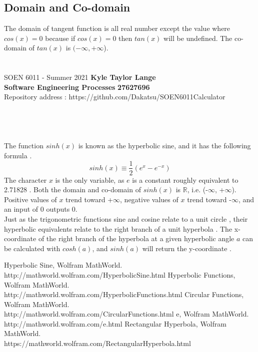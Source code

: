 \documentclass[a4paper, 11pt]{report}
\begin{document}
 \subsection*{Domain and Co-domain}
 \normalsize{The domain of tangent function is all real number except the value where $cos(x) = 0$ because if $cos(x) = 0$ then $tan(x)$ will be undefined. The co-domain of $tan(x)$ is \((-\infty, +\infty\)).}
\pagebreak

\section*{}
\normalsize {SOEN 6011 - Summer 2021} \hfill \textbf{Kyle Taylor Lange} \\
\textbf{ Software Engineering Processes}  \hfill \textbf{27627696} \\
\hfill Repository address : https://github.com/Dakatsu/SOEN6011Calculator
\\\\\\\\\\
\normalsize{The function $sinh(x)$ is known as the hyperbolic sine, and it has the following formula \cite{sinh}. 
$$sinh(x) \equiv \frac{1}{2}(e^x-e^{-x})$$
The character $x$ is the only variable, as $e$ is a constant roughly equivalent to 2.71828 \cite{e}. Both the domain and co-domain of $sinh(x)$ is $\mathbb{R}$, i.e. (-$\infty$, +$\infty$). Positive values of $x$ trend toward +$\infty$, negative values of $x$ trend toward -$\infty$, and an input of 0 outputs 0.
\\Just as the trigonometric functions sine and cosine relate to a unit circle \cite{circular}, their hyperbolic equivalents relate to the right branch of a unit hyperbola \cite{hyperbolic}. The x-coordinate of the right branch of the hyperbola at a given hyperbolic angle $a$ can be calculated with $cosh(a)$, and $sinh(a)$ will return the y-coordinate \cite{rectHyperbola}.}
\begin{thebibliography}{}
Hyperbolic Sine, Wolfram MathWorld.
\\http://mathworld.wolfram.com/HyperbolicSine.html
Hyperbolic Functions, Wolfram MathWorld.
\\http://mathworld.wolfram.com/HyperbolicFunctions.html
Circular Functions, Wolfram MathWorld.
\\http://mathworld.wolfram.com/CircularFunctions.html
e, Wolfram MathWorld.
\\http://mathworld.wolfram.com/e.html
Rectangular Hyperbola, Wolfram MathWorld.
\\https://mathworld.wolfram.com/RectangularHyperbola.html
\end{thebibliography}
\pagebreak
\end{document}
